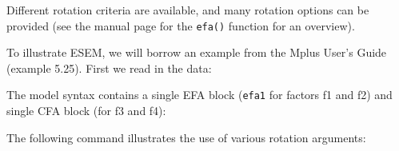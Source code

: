 \begin{Shaded}
\begin{Highlighting}[]
\OtherTok{\textless{}{-}} \NormalTok{(} \NormalTok{)}
\end{Highlighting}
\end{Shaded}

Different rotation criteria are available, and many rotation options can
be provided (see the manual page for the \texttt{efa()} function for an
overview).

To illustrate ESEM, we will borrow an example from the Mplus User's
Guide (example 5.25). First we read in the data:

\begin{Shaded}
\begin{Highlighting}[]
\OtherTok{\textless{}{-}} \NormalTok{(}\NormalTok{)}
\OtherTok{=} \NormalTok{(}\NormalTok{,}\SpecialCharTok{:}\NormalTok{)}
\end{Highlighting}
\end{Shaded}

The model syntax contains a single EFA block (\texttt{efa1} for factors
f1 and f2) and single CFA block (for f3 and f4):

\begin{Shaded}
\begin{Highlighting}[]
\OtherTok{\textless{}{-}} \StringTok{\textquotesingle{}}


\StringTok{\textquotesingle{}}
\end{Highlighting}
\end{Shaded}

The following command illustrates the use of various rotation arguments:

